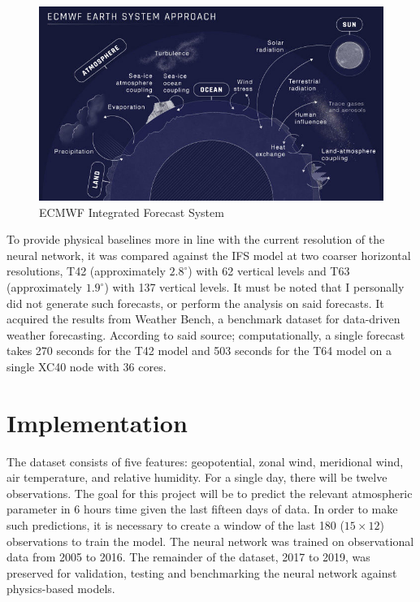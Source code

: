 \begin{figure}[H]
    \centering
    \includegraphics[width=.8\linewidth]{Images/ifs.jpg}
    \caption{ECMWF Integrated Forecast System}
\end{figure}

To provide physical baselines more in line with the current resolution of the neural network, it was compared against the IFS model at two coarser horizontal resolutions, T42 (approximately $2.8^{\circ}$) with 62 vertical levels and T63 (approximately $1.9^{\circ}$) with 137 vertical levels. It must be noted that I personally did not generate such forecasts, or perform the analysis on said forecasts. It acquired the results from Weather Bench, a benchmark dataset for data-driven weather forecasting. According to said source; computationally, a single forecast takes 270 seconds for the T42 model and 503 seconds for the T64 model on a single XC40 node with 36 cores.

\section{Implementation}\label{implement_rnn}
The dataset consists of five features: geopotential, zonal wind, meridional wind, air temperature, and relative humidity. For a single day, there will be twelve observations. The goal for this project will be to predict the relevant atmospheric parameter in 6 hours time given the last fifteen days of data. In order to make such predictions, it is necessary to create a window of the last 180 ($15 \times 12$) observations to train the model\cite{time_series}. The neural network was trained on observational data from 2005 to 2016. The remainder of the dataset, 2017 to 2019, was preserved for validation, testing and benchmarking the neural network against physics-based models.

